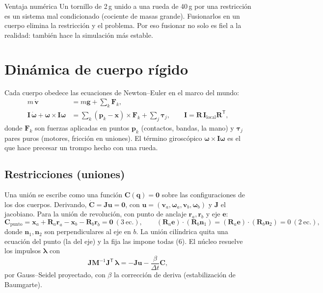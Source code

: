 \documentclass[11pt,a4paper]{article}
\numberwithin{equation}{section}
\newcommand{\vect}[1]{\bm{#1}}
\newcommand{\R}{\mathbf{R}}
\newcommand{\I}{\mathbf{I}}
\begin{document}
\begin{decision}{Ventaja numérica}
Un tornillo de 2\,g unido a una rueda de 40\,g por una restricción es un sistema mal condicionado (cociente de masas
grande). Fusionarlos en un cuerpo elimina la restricción y el problema. Por eso fusionar no solo es fiel a la
realidad: también hace la simulación más estable.
\end{decision}

\section{Dinámica de cuerpo rígido}

Cada cuerpo obedece las ecuaciones de Newton–Euler en el marco del mundo:
\begin{align}
  m\,\dot{\vect{v}} &= m\vect{g} + \sum_k \vect{F}_k,\\
  \I\,\dot{\vect{\omega}} + \vect{\omega}\times\I\vect{\omega} &= \sum_k (\vect{p}_k - \vect{x})\times\vect{F}_k + \sum_j \vect{\tau}_j,
  \qquad \I = \R\,\I_{\text{local}}\R^{\mathsf T},
\end{align}
donde $\vect{F}_k$ son fuerzas aplicadas en puntos $\vect{p}_k$ (contactos, bandas, la mano) y $\vect{\tau}_j$
pares puros (motores, fricción en uniones). El término giroscópico $\vect{\omega}\times\I\vect{\omega}$ es el que hace
precesar un trompo hecho con una rueda.

\subsection{Restricciones (uniones)}
Una unión se escribe como una función $\vect{C}(\vect{q}) = \vect{0}$ sobre las configuraciones de los dos cuerpos.
Derivando, $\dot{\vect{C}} = \mathbf{J}\vect{u} = \vect{0}$, con $\vect{u} = (\vect{v}_a,\vect{\omega}_a,\vect{v}_b,\vect{\omega}_b)$
y $\mathbf{J}$ el jacobiano. Para la unión de revolución, con punto de anclaje $\vect{r}_a,\vect{r}_b$ y eje $\vect{e}$:
\begin{equation}
  \vect{C}_{\text{punto}} = \vect{x}_a + \R_a\vect{r}_a - \vect{x}_b - \R_b\vect{r}_b = \vect{0}\ (3\ \text{ec.}),\qquad
  (\R_a\vect{e})\cdot(\R_b\vect{n}_1) = (\R_a\vect{e})\cdot(\R_b\vect{n}_2) = 0\ (2\ \text{ec.}),
\end{equation}
donde $\vect{n}_1,\vect{n}_2$ son perpendiculares al eje en $b$. La unión cilíndrica quita una ecuación del punto
(la del eje) y la fija las impone todas (6). El núcleo resuelve los impulsos $\vect{\lambda}$ con
\begin{equation}
  \mathbf{J}\mathbf{M}^{-1}\mathbf{J}^{\mathsf T}\,\vect{\lambda} = -\mathbf{J}\vect{u} - \frac{\beta}{\Delta t}\vect{C},
\end{equation}
por Gauss–Seidel proyectado, con $\beta$ la corrección de deriva (estabilización de Baumgarte).
\end{document}
